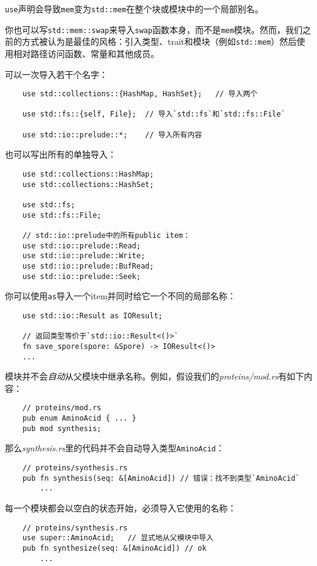 \texttt{use}声明会导致\texttt{mem}变为\texttt{std::mem}在整个块或模块中的一个局部别名。

你也可以写\texttt{std::mem::swap}来导入\texttt{swap}函数本身，而不是\texttt{mem}模块。然而，我们之前的方式被认为是最佳的风格：引入类型、trait和模块（例如\texttt{std::mem}）然后使用相对路径访问函数、常量和其他成员。

可以一次导入若干个名字：
\begin{verbatim}
    use std::collections::{HashMap, HashSet};   // 导入两个
    
    use std::fs::{self, File};  // 导入`std::fs`和`std::fs::File`
    
    use std::io::prelude::*;    // 导入所有内容
\end{verbatim}

也可以写出所有的单独导入：
\begin{verbatim}
    use std::collections::HashMap;
    use std::collections::HashSet;

    use std::fs;
    use std::fs::File;

    // std::io::prelude中的所有public item：
    use std::io::prelude::Read;
    use std::io::prelude::Write;
    use std::io::prelude::BufRead;
    use std::io::prelude::Seek;
\end{verbatim}

你可以使用\texttt{as}导入一个item并同时给它一个不同的局部名称：
\begin{verbatim}
    use std::io::Result as IOResult;

    // 返回类型等价于`std::io::Result<()>`
    fn save_spore(spore: &Spore) -> IOResult<()>
    ...
\end{verbatim}

模块并不会\emph{自动}从父模块中继承名称。例如，假设我们的\emph{proteins/mod.rs}有如下内容：
\begin{verbatim}
    // proteins/mod.rs
    pub enum AminoAcid { ... }
    pub mod synthesis;
\end{verbatim}

那么\emph{synthesis.rs}里的代码并不会自动导入类型\texttt{AminoAcid}：
\begin{verbatim}
    // proteins/synthesis.rs
    pub fn synthesis(seq: &[AminoAcid]) // 错误：找不到类型`AminoAcid`
        ...
\end{verbatim}

每一个模块都会以空白的状态开始，必须导入它使用的名称：
\begin{verbatim}
    // proteins/synthesis.rs
    use super::AminoAcid;   // 显式地从父模块中导入
    pub fn synthesize(seq: &[AminoAcid]) // ok
        ...
\end{verbatim}

